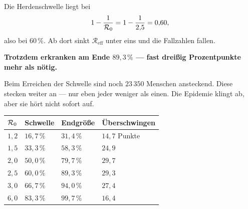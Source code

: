 \begin{warnung}
Die Herdenschwelle liegt bei
\[ 1 - \frac{1}{\mathcal{R}_0} = 1 - \frac{1}{2{,}5} = 0{,}60 , \]
also bei $60\,\%$. Ab dort sinkt $\mathcal{R}_{\text{eff}}$ unter eins und die Fallzahlen fallen.

\begin{center}
\begin{minipage}{0.9\textwidth}
\textbf{Trotzdem erkranken am Ende $89{,}3\,\%$ --- fast dreißig Prozentpunkte mehr als nötig.}
\end{minipage}
\end{center}

Beim Erreichen der Schwelle sind noch $23\,350$ Menschen ansteckend. Diese stecken weiter an --- nur eben jeder weniger als einen. Die Epidemie klingt ab, aber sie hört nicht sofort auf.

\begin{center}
\begin{minipage}{0.88\textwidth}
\end{minipage}
\end{center}

\begin{center}
{\small
\renewcommand{\arraystretch}{1.48}
\begin{tabular}{@{}P{1.2cm}P{1.8cm}P{1.8cm}P{2.4cm}@{}}
\toprule
$\mathcal{R}_0$ & \textbf{Schwelle} & \textbf{Endgröße} & \textbf{Über\-schwingen}\\
\midrule
$1{,}2$ & $16{,}7\,\%$ & $31{,}4\,\%$ & $14{,}7$ Punkte\\
$1{,}5$ & $33{,}3\,\%$ & $58{,}3\,\%$ & $24{,}9$\\
$2{,}0$ & $50{,}0\,\%$ & $79{,}7\,\%$ & \textbf{$29{,}7$}\\
$2{,}5$ & $60{,}0\,\%$ & $89{,}3\,\%$ & $29{,}3$\\
$3{,}0$ & $66{,}7\,\%$ & $94{,}0\,\%$ & $27{,}4$\\
$6{,}0$ & $83{,}3\,\%$ & $99{,}7\,\%$ & $16{,}4$\\
\bottomrule
\end{tabular}}
\end{center}

\begin{center}
\begin{minipage}{0.88\textwidth}
\end{minipage}
\end{center}
\end{warnung}

